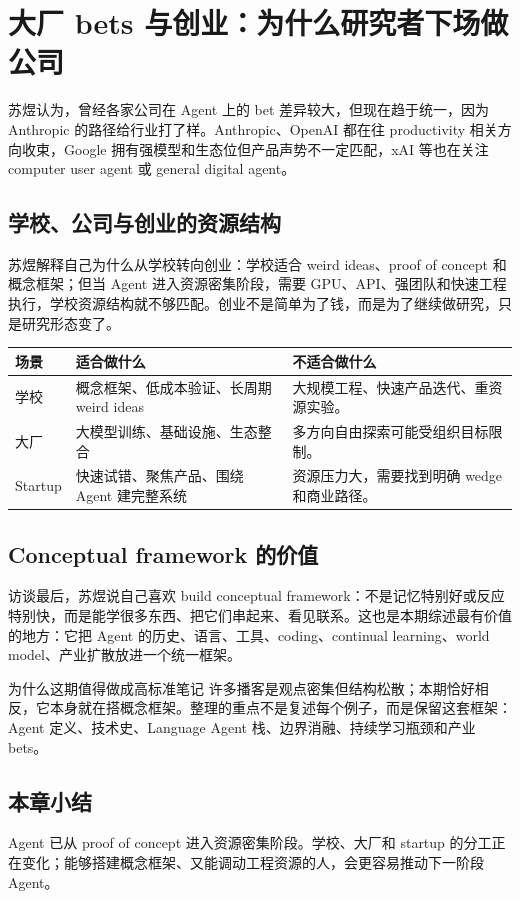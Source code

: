 \section{大厂 bets 与创业：为什么研究者下场做公司}

苏煜认为，曾经各家公司在 Agent 上的 bet 差异较大，但现在趋于统一，因为 Anthropic 的路径给行业打了样。Anthropic、OpenAI 都在往 productivity 相关方向收束，Google 拥有强模型和生态位但产品声势不一定匹配，xAI 等也在关注 computer user agent 或 general digital agent。




\subsection{学校、公司与创业的资源结构}

苏煜解释自己为什么从学校转向创业：学校适合 weird ideas、proof of concept 和概念框架；但当 Agent 进入资源密集阶段，需要 GPU、API、强团队和快速工程执行，学校资源结构就不够匹配。创业不是简单为了钱，而是为了继续做研究，只是研究形态变了。

\noindent\begin{tabularx}{\textwidth}{p{}p{}X}
\toprule
场景 & 适合做什么 & 不适合做什么 \\
\midrule
学校 & 概念框架、低成本验证、长周期 weird ideas & 大规模工程、快速产品迭代、重资源实验。 \\
大厂 & 大模型训练、基础设施、生态整合 & 多方向自由探索可能受组织目标限制。 \\
Startup & 快速试错、聚焦产品、围绕 Agent 建完整系统 & 资源压力大，需要找到明确 wedge 和商业路径。 \\
\bottomrule
\end{tabularx}

\subsection{Conceptual framework 的价值}

访谈最后，苏煜说自己喜欢 build conceptual framework：不是记忆特别好或反应特别快，而是能学很多东西、把它们串起来、看见联系。这也是本期综述最有价值的地方：它把 Agent 的历史、语言、工具、coding、continual learning、world model、产业扩散放进一个统一框架。

\begin{importantbox}{为什么这期值得做成高标准笔记}
许多播客是观点密集但结构松散；本期恰好相反，它本身就在搭概念框架。整理的重点不是复述每个例子，而是保留这套框架：Agent 定义、技术史、Language Agent 栈、边界消融、持续学习瓶颈和产业 bets。
\end{importantbox}

\subsection{本章小结}

Agent 已从 proof of concept 进入资源密集阶段。学校、大厂和 startup 的分工正在变化；能够搭建概念框架、又能调动工程资源的人，会更容易推动下一阶段 Agent。

